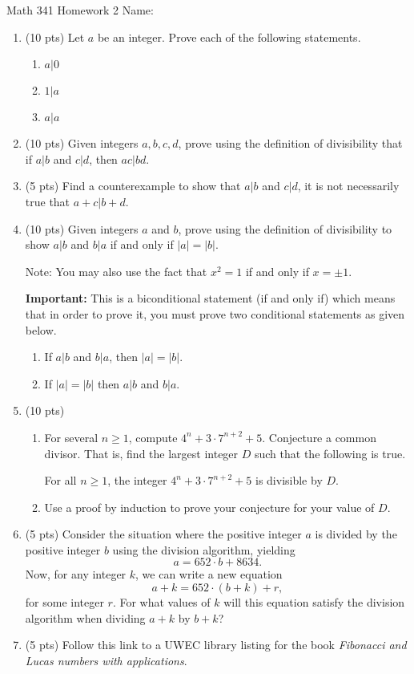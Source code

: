 \documentclass[12pt]{article}
\begin{document}
	Math 341 Homework 2
	\hfill
	Name: \underline{\hspace*{2in}}
	\begin{enumerate}
		\item (10 pts) Let $a$ be an integer. Prove each of the following statements.
			\begin{enumerate}
				\item $a|0$\vfill 
				\item $1|a$\vfill 
				\item $a|a$\vfill 
			\end{enumerate}
		\newpage
	\item (10 pts) Given integers $a,b,c,d$, prove using the definition of divisibility that if $a|b$ and $c|d$, then $ac|bd$.
	\vfill 
	\item (5 pts) Find a counterexample to show that $a|b$ and $c|d$, it is not necessarily true that $a+c|b+d$.\vfill
	\newpage 
	\item (10 pts) Given integers $a$ and $b$, prove using the definition of divisibility to show $a|b$ and $b|a$ if and only if $|a|=|b|$.
	
	Note: You may also use the fact that $x^2=1$ if and only if $x=\pm 1$.
	
	\textbf{Important:} This is a biconditional statement (if and only if) which means that in order to prove it, you must prove two conditional statements as given below.
		\begin{enumerate}
			\item If $a|b$ and $b|a$, then $|a|=|b|$.\vfill
			\item If $|a|=|b|$ then $a|b$ and $b|a$.\vfill
		\end{enumerate}
	\newpage
	\item (10 pts) 
		\begin{enumerate}
			\item For several $n\geq 1$, compute $4^n+3\cdot 7^{n+2}+5$. Conjecture a common divisor. That is, find the largest integer $D$ such that the following is true.
			\begin{center}
				For all $n\geq 1$, the integer $4^n+3\cdot 7^{n+2}+5$ is divisible by $D$.
			\end{center}
			\vskip 2in
			\item Use a proof by induction to prove your conjecture for your value of $D$.
		\end{enumerate}
	\newpage 
	\item (5 pts) Consider the situation where the positive integer $a$ is divided by the positive integer $b$ using the division algorithm, yielding 
$$a=652\cdot b+8634.$$
		Now, for any integer $k$, we can write a new equation 
			$$a+k=652\cdot (b+k)+r,$$
		for some integer $r$. For what values of $k$ will this equation satisfy the division algorithm when dividing $a+k$ by $b+k$?
	\newpage
	\item (5 pts) Follow this link to a UWEC library listing for the book \textit{Fibonacci and Lucas numbers with applications}.
	

\end{enumerate}
\end{document}
